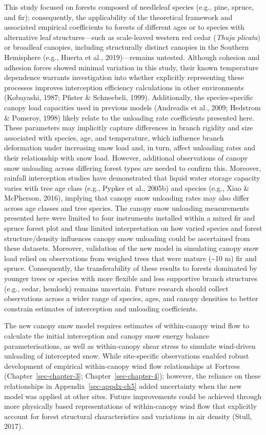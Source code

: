\documentclass[
  letterpaper,
]{tex/uofsthesis-cs}
\begin{document}
This study focused on forests composed of needleleaf species (e.g.,
pine, spruce, and fir); consequently, the applicability of the
theoretical framework and associated empirical coefficients to forests
of different ages or to species with alternative leaf structures---such
as scale-leaved western red cedar (\emph{Thuja plicata}) or broadleaf
canopies, including structurally distinct canopies in the Southern
Hemisphere (e.g., Huerta et al., 2019)---remains untested. Although
cohesion and adhesion forces showed minimal variation in this study,
their known temperature dependence warrants investigation into whether
explicitly representing these processes improves interception efficiency
calculations in other environments (Kobayashi, 1987; Pfister \&
Schneebeli, 1999). Additionally, the species-specific canopy load
capacities used in previous models (Andreadis et al., 2009; Hedstrom \&
Pomeroy, 1998) likely relate to the unloading rate coefficients
presented here. These parameters may implicitly capture differences in
branch rigidity and size associated with species, age, and temperature,
which influence branch deformation under increasing snow load and, in
turn, affect unloading rates and their relationship with snow load.
However, additional observations of canopy snow unloading across
differing forest types are needed to confirm this. Moreover, rainfall
interception studies have demonstrated that liquid water storage
capacity varies with tree age class (e.g., Pypker et al., 2005b) and
species (e.g., Xiao \& McPherson, 2016), implying that canopy snow
unloading rates may also differ across age classes and tree species. The
canopy snow unloading measurements presented here were limited to four
instruments installed within a mixed fir and spruce forest plot and thus
limited interpretation on how varied species and forest
structure/density influences canopy snow unloading could be ascertained
from these datasets. Moreover, validation of the new model in simulating
canopy snow load relied on observations from weighed trees that were
mature (\textasciitilde10 m) fir and spruce. Consequently, the
transferability of these results to forests dominated by younger trees
or species with more flexible and less supportive branch structures
(e.g., cedar, hemlock) remains uncertain. Future research should collect
observations across a wider range of species, ages, and canopy densities
to better constrain estimates of interception and unloading
coefficients.

The new canopy snow model requires estimates of within-canopy wind flow
to calculate the initial interception and canopy snow energy balance
parameterisations, as well as within-canopy shear stress to simulate
wind-driven unloading of intercepted snow. While site-specific
observations enabled robust development of empirical within-canopy wind
flow relationships at Fortress (Chapter~\ref{sec-chapter-3};
Chapter~\ref{sec-chapter-4}); however, the reliance on these
relationships in Appendix~\ref{sec-appdx-ch5} added uncertainty when the
new model was applied at other sites. Future improvements could be
achieved through more physically based representations of within-canopy
wind flow that explicitly account for forest structural characteristics
and variations in air density (Stull, 2017).
\end{document}
